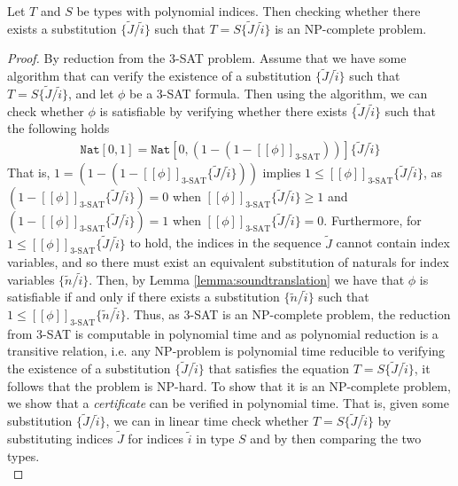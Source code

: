 \begin{lemma}\label{lemma:npcompletesubst}
Let $T$ and $S$ be types with polynomial indices. Then checking whether there exists a substitution $\{\widetilde{J}/\widetilde{i}\}$ such that $T = S\{\widetilde{J}/\widetilde{i}\}$ is an NP-complete problem.
\begin{proof}
By reduction from the 3-SAT problem. Assume that we have some algorithm that can verify the existence of a substitution $\{\widetilde{J}/\widetilde{i}\}$ such that $T = S\{\widetilde{J}/\widetilde{i}\}$, and let $\phi$ be a 3-SAT formula. Then using the algorithm, we can check whether $\phi$ is satisfiable by verifying whether there exists $\{\widetilde{J}/\widetilde{i}\}$ such that the following holds
\begin{align*}
    \texttt{Nat}[0,1] = \texttt{Nat}[0,(1 - (1 - [\![\phi]\!]_{\text{3-SAT}}))]\{\widetilde{J}/\widetilde{i}\}
\end{align*}
That is, $1 = (1 - (1 - [\![\phi]\!]_{\text{3-SAT}}\{\widetilde{J}/\widetilde{i}\}))$ implies $1 \leq [\![\phi]\!]_{\text{3-SAT}}\{\widetilde{J}/\widetilde{i}\}$, as $(1 - [\![\phi]\!]_{\text{3-SAT}}\{\widetilde{J}/\widetilde{i}\}) = 0$ when $[\![\phi]\!]_{\text{3-SAT}}\{\widetilde{J}/\widetilde{i}\} \geq 1$ and $(1 - [\![\phi]\!]_{\text{3-SAT}}\{\widetilde{J}/\widetilde{i}\}) = 1$ when $[\![\phi]\!]_{\text{3-SAT}}\{\widetilde{J}/\widetilde{i}\} = 0$. Furthermore, for $1 \leq [\![\phi]\!]_{\text{3-SAT}}\{\widetilde{J}/\widetilde{i}\}$ to hold, the indices in the sequence $\widetilde{J}$ cannot contain index variables, and so there must exist an equivalent substitution of naturals for index variables $\{\widetilde{n}/\widetilde{i}\}$. Then, by Lemma \ref{lemma:soundtranslation} we have that $\phi$ is satisfiable if and only if there exists a substitution $\{\widetilde{n}/\widetilde{i}\}$ such that $1\leq [\![\phi]\!]_{\text{3-SAT}}\{\widetilde{n}/\widetilde{i}\}$. Thus, as 3-SAT is an NP-complete problem, the reduction from 3-SAT is computable in polynomial time and as polynomial reduction is a transitive relation, i.e. any NP-problem is polynomial time reducible to verifying the existence of a substitution $\{\widetilde{J}/\widetilde{i}\}$ that satisfies the equation $T = S\{\widetilde{J}/\widetilde{i}\}$, it follows that the problem is NP-hard. To show that it is an NP-complete problem, we show that a \textit{certificate} can be verified in polynomial time. That is, given some substitution $\{\widetilde{J}/\widetilde{i}\}$, we can in linear time check whether $T=S\{\widetilde{J}/\widetilde{i}\}$ by substituting indices $\widetilde{J}$ for indices $\widetilde{i}$ in type $S$ and by then comparing the two types.\\

\end{proof}
\end{lemma}
